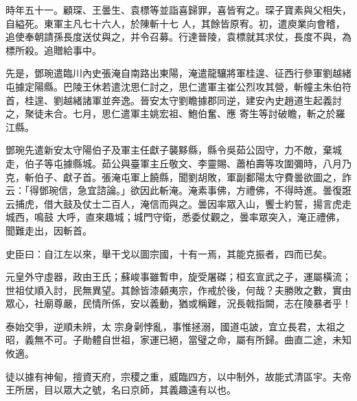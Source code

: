 \begin{pinyinscope}
 時年五十一。顧琛、王曇生、袁標等並詣喜歸罪，喜皆宥之。琛子寶素與父相失，自縊死。東軍主凡七十六人，於陳斬十七
 人，其餘皆原宥。初，遣庾業向會稽，追使奉朝請孫長度送仗與之，并令召募。行達晉陵，袁標就其求仗，長度不與，為標所殺。追贈給事中。



 先是，鄧琬遣臨川內史張淹自南路出東陽，淹遣龍驤將軍桂遑、征西行參軍劉越緒屯據定陽縣。巴陵王休若遣沈思仁討之，思仁遣軍主崔公烈攻其營，斬幢主朱伯符首，桂遑、劉越緒諸軍並奔逸。晉安太守劉瞻據郡同逆，建安內史趙道生起義討之，聚徒未合。七月，思仁遣軍主姚宏祖、鮑伯奮、應
 寄生等討破瞻，斬之於羅江縣。



 鄧琬先遣新安太守陽伯子及軍主任獻子襲黟縣，縣令吳茹公固守，力不敵，棄城走，伯子等屯據縣城。茹公與臺軍主丘敬文、李靈賜、蕭柏壽等攻圍彌時，八月乃克，斬伯子、獻子首。張淹屯軍上饒縣，聞劉胡敗，軍副鄱陽太守費曇欲圖之，詐云：「得鄧琬信，急宜諮論。」欲因此斬淹。淹素事佛，方禮佛，不得時進。曇復誑云捕虎，借大鼓及仗士二百人，淹信而與之。曇因率眾入山，饗士約誓，揚言虎走城西，鳴鼓
 大呼，直來趣城；城門守衛，悉委仗觀之，曇率眾突入，淹正禮佛，聞難走出，因斬首。



 史臣曰：自江左以來，舉干戈以圖宗國，十有一焉，其能克振者，四而已矣。



 元皇外守虛器，政由王氏；蘇峻事雖暫申，旋受屠磔；桓玄宣武之子，運屬橫流；世祖仗順入討，民無異望。其餘皆漆顙夷宗，作戒於後，何哉？夫勝敗之數，實由眾心，社廟尊嚴，民情所係，安以義動，猶或稱難，況長戟指闕，志在陵暴者乎！



 泰始交爭，逆順未辨，太
 宗身劋悖亂，事惟拯溺，國道屯詖，宜立長君，太祖之昭，義無不可。子勛體自世祖，家運已絕，當璧之命，屬有所歸。曲直二途，未知攸適。



 徒以據有神甸，擅資天府，宗稷之重，威臨四方，以中制外，故能式清區宇。夫帝王所居，目以眾大之號，名曰京師，其義趣遠有以也。



\end{pinyinscope}